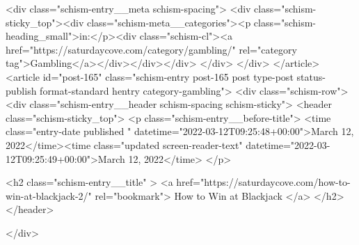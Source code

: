 {		<div class="schism-entry__meta schism-spacing">			<div class="schism-sticky_top"><div class="schism-meta__categories"><p class="schism-heading_small">in:</p><div class="schism-cl"><a href="https://saturdaycove.com/category/gambling/" rel="category tag">Gambling</a></div></div></div>		</div>
	</div>
</article>
<article id="post-165" class="schism-entry post-165 post type-post status-publish format-standard hentry category-gambling">
	<div class="schism-row">		<div class="schism-entry__header schism-spacing schism-sticky">			<header class="schism-sticky_top">				<p class="schism-entry__before-title">
					<time class="entry-date published " datetime="2022-03-12T09:25:48+00:00">March 12, 2022</time><time class="updated screen-reader-text" datetime="2022-03-12T09:25:49+00:00">March 12, 2022</time>				</p>

				<h2 class="schism-entry__title" >
					<a href="https://saturdaycove.com/how-to-win-at-blackjack-2/" rel="bookmark">
						How to Win at Blackjack					</a>
				</h2>
			</header>

					</div>

}
